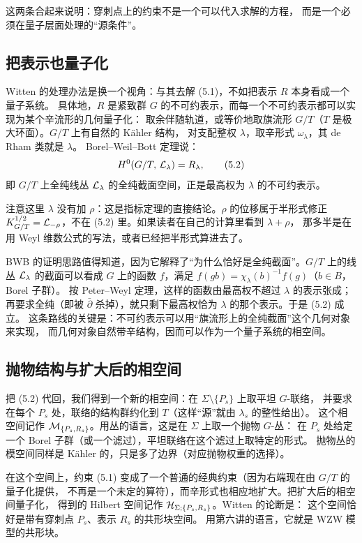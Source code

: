 这两条合起来说明：穿刺点上的约束不是一个可以代入求解的方程，
而是一个必须在量子层面处理的“源条件”。

\subsection{把表示也量子化}

Witten 的处理办法是换一个视角：与其去解 (5.1)，不如把表示 $R$ 本身看成一个量子系统。
具体地，$R$ 是紧致群 $G$ 的不可约表示，而每一个不可约表示都可以实现为某个辛流形的几何量子化：
取余伴随轨道，或等价地取旗流形 $G/T$（$T$ 是极大环面）。$G/T$ 上有自然的 Kähler 结构，
对支配整权 $\lambda$，取辛形式 $\omega_\lambda$，其 de Rham 类就是 $\lambda$。
Borel--Weil--Bott 定理说：
\begin{equation}
H^0(G/T,\,\mathcal{L}_\lambda)=R_\lambda, \tag{5.2}
\end{equation}
即 $G/T$ 上全纯线丛 $\mathcal{L}_\lambda$ 的全纯截面空间，正是最高权为 $\lambda$ 的不可约表示。

注意这里 $\lambda$ 没有加 $\rho$：这是指标定理的直接结论。$\rho$ 的位移属于半形式修正
$K_{G/T}^{1/2}=\mathcal{L}_{-\rho}$，不在 (5.2) 里。如果读者在自己的计算里看到 $\lambda+\rho$，
那多半是在用 Weyl 维数公式的写法，或者已经把半形式算进去了。

BWB 的证明思路值得知道，因为它解释了“为什么恰好是全纯截面”。$G/T$ 上的线丛 $\mathcal{L}_\lambda$
的截面可以看成 $G$ 上的函数 $f$，满足 $f(gb)=\chi_\lambda(b)^{-1}f(g)$（$b\in B$，Borel 子群）。
按 Peter--Weyl 定理，这样的函数由最高权不超过 $\lambda$ 的表示张成；再要求全纯（即被
$\bar\partial$ 杀掉），就只剩下最高权恰为 $\lambda$ 的那个表示。于是 (5.2) 成立。
这条路线的关键是：不可约表示可以用“旗流形上的全纯截面”这个几何对象来实现，
而几何对象自然带辛结构，因而可以作为一个量子系统的相空间。

\subsection{抛物结构与扩大后的相空间}

把 (5.2) 代回，我们得到一个新的相空间：在 $\Sigma\setminus\{P_s\}$ 上取平坦 $G$-联络，
并要求在每个 $P_s$ 处，联络的结构群约化到 $T$（这样“源”就由 $\lambda_s$ 的整性给出）。
这个相空间记作 $\mathcal{M}_{\{P_s,R_s\}}$。用丛的语言，这是在 $\Sigma$ 上取一个抛物 $G$-丛：
在 $P_s$ 处给定一个 Borel 子群（或一个滤过），平坦联络在这个滤过上取特定的形式。
抛物丛的模空间同样是 Kähler 的，只是多了边界（对应抛物权重的选择）。

在这个空间上，约束 (5.1) 变成了一个普通的经典约束（因为右端现在由 $G/T$ 的量子化提供，
不再是一个未定的算符），而辛形式也相应地扩大。把扩大后的相空间量子化，
得到的 Hilbert 空间记作 $\mathcal{H}_{\Sigma;\{P_s,R_s\}}$。Witten 的论断是：
这个空间恰好是带有穿刺点 $P_s$、表示 $R_s$ 的共形块空间。
用第六讲的语言，它就是 WZW 模型的共形块。

